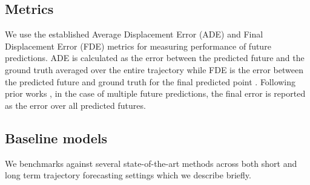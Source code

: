 \documentclass[final]{cvpr}
\begin{document}
\subsection{Metrics}
We use the established Average Displacement Error (ADE) and Final Displacement Error (FDE) metrics for measuring performance of future predictions. ADE is calculated as the  error between the predicted future and the ground truth averaged over the entire trajectory while FDE is the  error between the predicted future and ground truth for the final predicted point \cite{alahi2014socially}. Following prior works \cite{gupta2018social}, in the case of multiple future predictions, the final error is reported as the  error over all predicted futures.


\subsection{Baseline models}
We benchmarks against several state-of-the-art methods across both short and long term trajectory forecasting settings which we describe briefly.  
\end{document}
